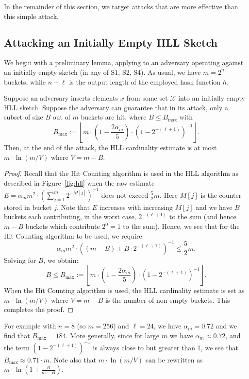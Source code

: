 \documentclass[sigconf, anonymous, dvipsnames]{acmart} %
\begin{document}
In the remainder of this section, we target attacks that are more effective than this simple attack.

\subsection{Attacking an Initially Empty HLL Sketch}\label{sec:empty} 

We begin with a preliminary lemma, applying to an adversary operating against an initially empty sketch (in any of S1, S2, S4). As usual, we have $m=2^n$ buckets, while $n+\ell$ is the output length of the employed hash function $h$.

\begin{lemma}\label{lem:bound}
Suppose an adversary inserts elements $x$ from some set ${\mathcal{X}}$ into an initially empty HLL sketch. Suppose the adversary can guarantee that in its attack, only a subset of size $B$ out of $m$ buckets are hit, where $B \leq B_{\max}$ with 
\[
B_{\max} := \left\lfloor m\cdot\left(1-\frac{2\alpha_m}{5}\right)\cdot\left(1-2^{-(\ell+1)}\right)^{-1} \right\rfloor. \label{eqn:1} 
\]
Then, at the end of the attack, the HLL cardinality estimate is at most $m \cdot \ln (m/V)$ where $V = m-B$.
\end{lemma}

\begin{proof}
Recall that the Hit Counting algorithm is used in the HLL algorithm as described in Figure~\ref{fig:hll} when the raw 
estimate $E = \alpha_mm^2\cdot(\sum_{j=1}^m2^{-M[j]})^{-1}$ does not exceed $\frac{5}{2}m$. Here $M[j]$ is the counter stored in bucket $j$. Note that $E$ increases with increasing $M[j]$ and we have $B$ buckets each contributing, in the worst case, $2^{-(\ell+1)}$ to the sum (and hence $m-B$ buckets which contribute $2^{0}=1$ to the sum). Hence, we see that for the Hit Counting algorithm to be used, we require:
\[
\alpha_mm^2\cdot\left((m-B)+B\cdot2^{-(\ell+1)}\right)^{-1} \le \frac{5}{2}m.
\]
Solving for $B$, we obtain:
\[
B \le B_{\max} := \left\lfloor m\cdot\left(1-\frac{2\alpha_m}{5}\right)\cdot\left(1-2^{-(\ell+1)}\right)^{-1} \right\rfloor.
\]
When the Hit Counting algorithm is used, the HLL cardinality estimate is set as $m \cdot \ln (m/V)$ where $V = m-B$ is the number of non-empty buckets. This completes the proof.
\end{proof}

For example with $n = 8$ (so $m=256$) and $\ell = 24$, we have $\alpha_m = 0.72$ and we find that $B_{\max}=184$. More generally, since for large $m$ we have $\alpha_m \approx 0.72$, and the term $(1-2^{-(\ell+1)})^{-1}$ is always close to but greater than 1, we see that $B_{\max} \approx  0.71\cdot m$. Note also that $m \cdot \ln (m/V)$ can be rewritten as $m \cdot \ln (1+\frac{B}{m-B})$.
\end{document}
